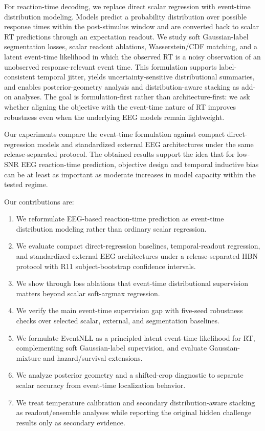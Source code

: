 \documentclass[12pt]{article}
\begin{document}
For reaction-time decoding, we replace direct scalar regression with event-time distribution modeling. Models predict a probability distribution over possible response times within the post-stimulus window and are converted back to scalar RT predictions through an expectation readout. We study soft Gaussian-label segmentation losses, scalar readout ablations, Wasserstein/CDF matching, and a latent event-time likelihood in which the observed RT is a noisy observation of an unobserved response-relevant event time. This formulation supports label-consistent temporal jitter, yields uncertainty-sensitive distributional summaries, and enables posterior-geometry analysis and distribution-aware stacking as add-on analyses. The goal is formulation-first rather than architecture-first: we ask whether aligning the objective with the event-time nature of RT improves robustness even when the underlying EEG models remain lightweight.

Our experiments compare the event-time formulation against compact direct-regression models and standardized external EEG architectures under the same release-separated protocol. The obtained results support the idea that for low-SNR EEG reaction-time prediction, objective design and temporal inductive bias can be at least as important as moderate increases in model capacity within the tested regime.

Our contributions are:
\begin{enumerate}
    \item We reformulate EEG-based reaction-time prediction as event-time distribution modeling rather than ordinary scalar regression.
    \item We evaluate compact direct-regression baselines, temporal-readout regression, and standardized external EEG architectures under a release-separated HBN protocol with R11 subject-bootstrap confidence intervals.
    \item We show through loss ablations that event-time distributional supervision matters beyond scalar soft-argmax regression.
    \item We verify the main event-time supervision gap with five-seed robustness checks over selected scalar, external, and segmentation baselines.
    \item We formulate EventNLL as a principled latent event-time likelihood for RT, complementing soft Gaussian-label supervision, and evaluate Gaussian-mixture and hazard/survival extensions.
    \item We analyze posterior geometry and a shifted-crop diagnostic to separate scalar accuracy from event-time localization behavior.
    \item We treat temperature calibration and secondary distribution-aware stacking as readout/ensemble analyses while reporting the original hidden challenge results only as secondary evidence.
\end{enumerate}
\end{document}
